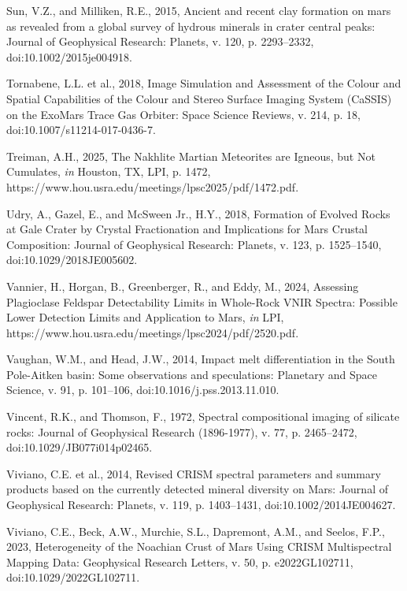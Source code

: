 \documentclass[11pt]{article}
\begin{document}
\begin{thebibliography}{99}
 Sun, V.Z., and Milliken, R.E., 2015, Ancient and recent clay formation on mars as revealed from a global survey of hydrous minerals in crater central peaks: Journal of Geophysical Research: Planets, v. 120, p. 2293--2332, doi:10.1002/2015je004918.

 Tornabene, L.L. et al., 2018, Image Simulation and Assessment of the Colour and Spatial Capabilities of the Colour and Stereo Surface Imaging System (CaSSIS) on the ExoMars Trace Gas Orbiter: Space Science Reviews, v. 214, p. 18, doi:10.1007/s11214-017-0436-7.

 Treiman, A.H., 2025, The Nakhlite Martian Meteorites are Igneous, but Not Cumulates, \textit{in} Houston, TX, LPI, p. 1472, https://www.hou.usra.edu/meetings/lpsc2025/pdf/1472.pdf.

 Udry, A., Gazel, E., and McSween Jr., H.Y., 2018, Formation of Evolved Rocks at Gale Crater by Crystal Fractionation and Implications for Mars Crustal Composition: Journal of Geophysical Research: Planets, v. 123, p. 1525--1540, doi:10.1029/2018JE005602.

 Vannier, H., Horgan, B., Greenberger, R., and Eddy, M., 2024, Assessing Plagioclase Feldspar Detectability Limits in Whole-Rock VNIR Spectra: Possible Lower Detection Limits and Application to Mars, \textit{in} LPI, https://www.hou.usra.edu/meetings/lpsc2024/pdf/2520.pdf.

 Vaughan, W.M., and Head, J.W., 2014, Impact melt differentiation in the South Pole-Aitken basin: Some observations and speculations: Planetary and Space Science, v. 91, p. 101--106, doi:10.1016/j.pss.2013.11.010.

 Vincent, R.K., and Thomson, F., 1972, Spectral compositional imaging of silicate rocks: Journal of Geophysical Research (1896-1977), v. 77, p. 2465--2472, doi:10.1029/JB077i014p02465.

 Viviano, C.E. et al., 2014, Revised CRISM spectral parameters and summary products based on the currently detected mineral diversity on Mars: Journal of Geophysical Research: Planets, v. 119, p. 1403--1431, doi:10.1002/2014JE004627.

 Viviano, C.E., Beck, A.W., Murchie, S.L., Dapremont, A.M., and Seelos, F.P., 2023, Heterogeneity of the Noachian Crust of Mars Using CRISM Multispectral Mapping Data: Geophysical Research Letters, v. 50, p. e2022GL102711, doi:10.1029/2022GL102711.


\end{thebibliography}
\end{document}
